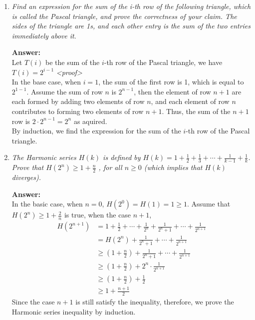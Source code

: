 \documentclass[a4paper,12pt]{article}
\begin{document}
\begin{enumerate}
\item {\it Find an expression for the sum of the i-th row of the following triangle, which is called the Pascal triangle, and prove the correctness of your claim. The sides of the triangle are 1s, and each other entry is the sum of the two entries immediately above it}. %

\textbf{Answer:}\\
Let $T(i)$ be the sum of the $i$-th row of the Pascal triangle, we have $T(i)=2^{i-1}$
\emph{<proof>} \\
In the base case, when $i=1$, the sum of the first row is 1, which is equal to $2^{1-1}$. Assume the sum of row $n$ is $2^{n-1}$, then the element of row $n+1$ are each formed by adding two elements of row $n$, and each element of row $n$ contributes to forming two elements of row $n+1$. Thus, the sum of the $n+1$ row is $2 \cdot 2^{n-1} = 2^{n}$ as aquired.\\
By induction, we find the expression for the sum of the $i$-th row of the Pascal triangle.

\item {\it The Harmonic series $H(k)$ is defined by $H(k) = 1+ \frac{1}{2} + \frac{1}{3} +\cdots+ \frac{1}{k-1} + \frac{1}{k}$. Prove that $H(2^n) \geq 1 + \frac{n}{2}$ , for all $n\geq 0$ (which implies that $H(k)$ diverges).}

\textbf{Answer:}\\
In the basic case, when $n=0$, $H(2^0)=H(1)=1\geq1$. Assume that $H(2^n) \geq 1+\frac{2}{n}$ is true, when the case $n+1$, \\
\[\begin{split}
    H(2^{n+1}) & = 1 + \frac{1}{2} + \cdots + \frac{1}{2^n} + \frac{1}{2^n + 1} + \cdots + \frac{1}{2^{n+1}} \\
    & = H(2^n) + \frac{1}{2^n + 1} + \cdots + \frac{1}{2^{n+1}} \\
    & \geq (1+\frac{n}{2}) + \frac{1}{2^n + 1} + \cdots + \frac{1}{2^{n+1}} \\
    & \geq (1+\frac{n}{2}) + 2^n \cdot \frac{1}{2^{n+1}} \\
    & \geq (1+\frac{n}{2}) + \frac{1}{2} \\
    & \geq 1 + \frac{n+1}{2}
\end{split}\]
Since the case $n+1$ is still satisfy the inequality, therefore, we prove the Harmonic series inequality by induction.


\end{enumerate}
\end{document}
